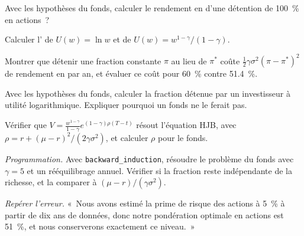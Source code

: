 \begin{exercise}[$\star$]\label{exo:qm:stochastic-control:2}
Avec les hypothèses du fonds, calculer le rendement en  d'une détention de 100~\% en actions~?
\end{exercise}

\begin{exercise}[$\star$]\label{exo:qm:stochastic-control:3}
Calculer l' de $U(w) = \ln w$ et de $U(w) = w^{1-\gamma}/(1 - \gamma)$.
\end{exercise}

\begin{exercise}[$\star\star$]\label{exo:qm:stochastic-control:4}
Montrer que détenir une fraction constante $\pi$ au lieu de $\pi^*$ coûte $\tfrac12\gamma\sigma^2(\pi - \pi^*)^2$ de rendement en  par an,
et évaluer ce coût pour 60~\% contre 51.4~\%.
\end{exercise}

\begin{exercise}[$\star\star$]\label{exo:qm:stochastic-control:5}
Avec les hypothèses du fonds, calculer la fraction détenue par un investisseur à utilité logarithmique. Expliquer pourquoi un fonds ne le ferait pas.
\end{exercise}

\begin{exercise}[$\star\star$]\label{exo:qm:stochastic-control:6}
Vérifier que $V = \frac{w^{1-\gamma}}{1-\gamma}e^{(1-\gamma)\rho(T-t)}$ résout l'équation HJB, avec $\rho = r + (\mu - r)^2/(2\gamma\sigma^2)$, et
calculer $\rho$ pour le fonds.
\end{exercise}

\begin{exercise}[$\star\star\star$]\label{exo:qm:stochastic-control:7}
\emph{Programmation.} Avec \texttt{backward\_induction}, résoudre le problème du fonds avec $\gamma = 5$ et un rééquilibrage annuel. Vérifier si
la fraction reste indépendante de la richesse, et la comparer à $(\mu - r)/(\gamma\sigma^2)$.
\end{exercise}

\begin{exercise}[$\star\star\star$]\label{exo:qm:stochastic-control:8}
\emph{Repérer l'erreur.} «~Nous avons estimé la prime de risque des actions à 5~\% à partir de dix ans de données, donc notre pondération optimale en actions est
51~\%, et nous conserverons exactement ce niveau.~»
\end{exercise}

